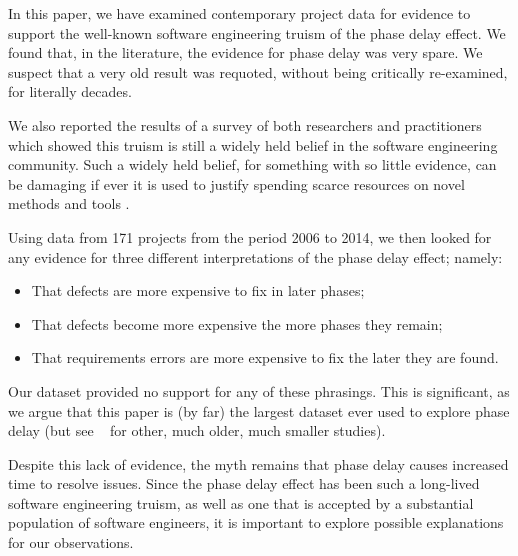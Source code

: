\documentclass{sig-alternate}
\newcommand{\bi}{\begin{itemize}[leftmargin=0.4cm]}
\newcommand{\ei}{\end{itemize}}
\begin{document}
In this paper, we have examined contemporary project data for evidence to support the well-known software engineering truism of the phase delay effect. 
We found that, in the literature, the evidence for phase delay was very spare.
We suspect that a very old result was requoted, without being 
critically re-examined, for literally decades.

We  also  reported the results of a survey of both researchers and practitioners which showed this truism is still a widely held belief in the software engineering community. Such a widely
held belief, for something with so little evidence, can be damaging if ever it is used
to justify spending scarce resources on novel  methods and tools .

Using data from 171 projects from the period 2006 to 2014, we then looked for any evidence
for three different interpretations of the phase delay effect; namely:
\bi
\item
That defects are more expensive to fix in later phases; 
\item
That defects become more expensive the more phases they remain; 
\item
That requirements errors are more expensive to fix the later they are found. 
\ei
Our dataset provided no support for any of these phrasings. 
This is significant, as we argue that this paper is (by far)    the largest dataset ever used to explore phase delay (but see ~\cite{Boehm80,Clutterbuck09,Shull02,Royce98} 
for other, much older, much smaller studies).


 


Despite this lack of evidence, the myth remains that phase delay causes increased time to resolve issues.
 Since the phase delay effect has been such a long-lived software engineering truism, as well as one that is accepted by a substantial population of software engineers, it is important to explore possible explanations for our observations.
 
\end{document}
